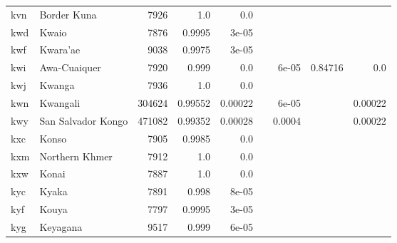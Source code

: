 \documentclass[11pt]{article}
\begin{document}
\begin{table*}[h]
{\begin{tabular}{llrrrrrrr}
kvn         & Border Kuna         & 7926         & 1.0         & 0.0         &          &          &          &          \\

kwd         & Kwaio         & 7876         & 0.9995         & 3e-05         &          &          &          &          \\

kwf         & Kwara'ae         & 9038         & 0.9975         & 3e-05         &          &          &          &          \\

kwi         & Awa-Cuaiquer         & 7920         & 0.999         & 0.0         &          & 6e-05         & 0.84716         & 0.0         \\

kwj         & Kwanga         & 7936         & 1.0         & 0.0         &          &          &          &          \\

kwn         & Kwangali         & 304624         & 0.99552         & 0.00022         &          & 6e-05         &          & 0.00022         \\

kwy         & San Salvador Kongo         & 471082         & 0.99352         & 0.00028         &          & 0.0004         &          & 0.00022         \\

kxc         & Konso         & 7905         & 0.9985         & 0.0         &          &          &          &          \\

kxm         & Northern Khmer         & 7912         & 1.0         & 0.0         &          &          &          &          \\

kxw         & Konai         & 7887         & 1.0         & 0.0         &          &          &          &          \\

kyc         & Kyaka         & 7891         & 0.998         & 8e-05         &          &          &          &          \\

kyf         & Kouya         & 7797         & 0.9995         & 3e-05         &          &          &          &          \\

kyg         & Keyagana         & 9517         & 0.999         & 6e-05         &          &          &          &          \\


\end{tabular}}
\end{table*}
\end{document}
